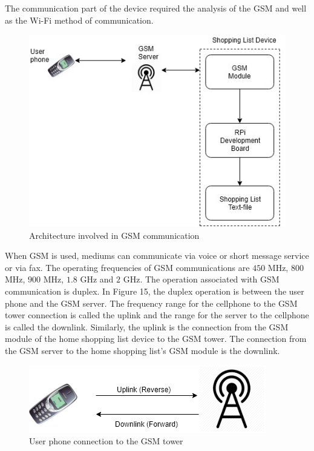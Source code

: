 The communication part of the device required the analysis of the GSM and well as the Wi-Fi method of communication. 
\begin{figure}[h]
	\centering
	\includegraphics[scale=0.4]{17.jpg}
	\caption{Architecture involved in GSM communication}
\end{figure}

When GSM is used, mediums can communicate via voice or short message service or via fax. The operating frequencies of GSM communications are $450$ MHz, $800$ MHz, $900$ MHz, $1.8$ GHz and $2$ GHz. The operation associated with GSM communication is duplex. In Figure 15, the duplex operation is between the user phone and the GSM server. The frequency range for the cellphone to the GSM tower connection is called the uplink and the range for the server to the cellphone is called the downlink. Similarly, the uplink is the connection from the GSM module of the home shopping list device to the GSM tower. The connection from the GSM server to the home shopping list's GSM module is the downlink.\\
\begin{figure}[h]
	\centering
	\includegraphics[scale=0.6]{17.png}
	\caption{User phone connection to the GSM tower}
\end{figure}

